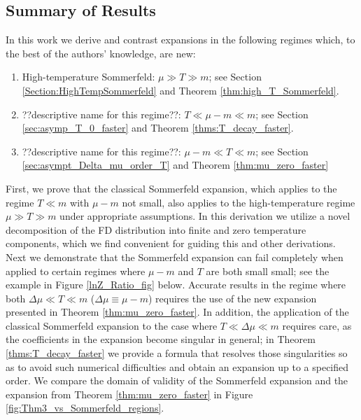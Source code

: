 \documentclass[sn-mathphys,Numbered]{sn-jnl}
\begin{document}
\subsection{Summary of Results}
In this work we derive and contrast expansions in the following regimes which, to the best of the authors' knowledge, are new:
\begin{enumerate}
\item High-temperature Sommerfeld: $\mu\gg T\gg m$; see  Section \ref{Section:HighTempSommerfeld} and Theorem \ref{thm:high_T_Sommerfeld}.
\item ??descriptive name for this regime??: $T\ll \mu-m\ll m$; see Section \ref{sec:asymp_T_0_faster} and Theorem \ref{thms:T_decay_faster}.
\item ??descriptive name for this regime??: $\mu-m\ll T\ll m$; see Section \ref{sec:asympt_Delta_mu_order_T} and Theorem \ref{thm:mu_zero_faster}
\end{enumerate}
First, we prove that the classical Sommerfeld expansion, which applies to the regime $T\ll m$ with $\mu-m$ not small, also applies to the high-temperature regime $\mu\gg T\gg m$ under appropriate assumptions.  In this derivation we utilize a novel decomposition of the FD distribution into finite and zero temperature components, which we find convenient for guiding this and other derivations. Next we demonstrate that the Sommerfeld expansion can fail completely when applied to certain regimes where $\mu-m$ and $T$ are both small small; see  the example in Figure \ref{lnZ_Ratio_fig} below. Accurate results in the regime where both $\Delta\mu\ll T\ll m$ ($\Delta\mu\equiv \mu-m$)  requires the use of the new expansion presented in Theorem \ref{thm:mu_zero_faster}. In addition, the application of the classical Sommerfeld expansion to the case where $T\ll\Delta\mu\ll m$ requires care, as the coefficients in the expansion become singular in general;  in Theorem \ref{thms:T_decay_faster} we provide a formula that  resolves those singularities so as to avoid such numerical difficulties and obtain an expansion up to a specified order. We compare the domain of validity of the Sommerfeld expansion and the expansion from  Theorem \ref{thm:mu_zero_faster} in Figure \ref{fig:Thm3_vs_Sommerfeld_regions}. 
\end{document}
